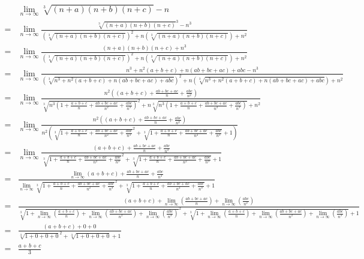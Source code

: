 \documentclass[a4paper,german,12pt,smallheadings]{scrartcl}
\begin{document}
\begin{landscape}
\begin{align*}
  &\lim_{n \to \infty} \sqrt[3]{(n+a)(n+b)(n+c)} - n \\
  = &\lim_{n \to \infty} \frac{\sqrt[3]{(n+a)(n+b)(n+c)}^3 - n^3}{\left(\sqrt[3]{(n+a)(n+b)(n+c)}\right)^2 + n\left(\sqrt[3]{(n+a)(n+b)(n+c)}\right) + n^2} \\
  = &\lim_{n \to \infty} \frac{(n+a)(n+b)(n+c) + n^3}{\left(\sqrt[3]{(n+a)(n+b)(n+c)}\right)^2 + n\left(\sqrt[3]{(n+a)(n+b)(n+c)}\right) + n^2} \\
  = &\lim_{n \to \infty} \frac{n^3 + n^2(a+b+c) + n(ab+bc+ac) + abc - n^3}{\left(\sqrt[3]{n^3 + n^2(a+b+c) + n(ab+bc+ac) + abc }\right)^2 + n\left(\sqrt[3]{n^3 + n^2(a+b+c) + n(ab+bc+ac) + abc }\right) + n^2} \\
  = &\lim_{n \to \infty} \frac{n^2\left((a+b+c) + \frac{ab+bc+ac}{n} + \frac{abc}{n^2}\right)}{\sqrt[3]{n^3 \left(1 + \frac{a+b+c}{n} + \frac{ab+bc+ac}{n^2} + \frac{abc}{n^3}\right)}^2 + n\sqrt[3]{n^3 \left(1 + \frac{a+b+c}{n} + \frac{ab+bc+ac}{n^2} + \frac{abc}{n^3}\right)} + n^2} \\
  = &\lim_{n \to \infty} \frac{n^2\left((a+b+c) + \frac{ab+bc+ac}{n} + \frac{abc}{n^2}\right)}{n^2\left(\sqrt[3]{1 + \frac{a+b+c}{n} + \frac{ab+bc+ac}{n^2} + \frac{abc}{n^3}}^2 + \sqrt[3]{1 + \frac{a+b+c}{n} + \frac{ab+bc+ac}{n^2} + \frac{abc}{n^3}} + 1\right)} \\
  = &\lim_{n \to \infty} \frac{(a+b+c) + \frac{ab+bc+ac}{n} + \frac{abc}{n^2}}{\sqrt[3]{1 + \frac{a+b+c}{n} + \frac{ab+bc+ac}{n^2} + \frac{abc}{n^3}}^2 + \sqrt[3]{1 + \frac{a+b+c}{n} + \frac{ab+bc+ac}{n^2} + \frac{abc}{n^3}} + 1} \\
  = &\frac{\lim_{n \to \infty} (a+b+c) + \frac{ab+bc+ac}{n} + \frac{abc}{n^2}}{\lim_{n \to \infty} \sqrt[3]{1 + \frac{a+b+c}{n} + \frac{ab+bc+ac}{n^2} + \frac{abc}{n^3}}^2 + \sqrt[3]{1 + \frac{a+b+c}{n} + \frac{ab+bc+ac}{n^2} + \frac{abc}{n^3}} + 1} \\
  = &\frac{(a+b+c) + \lim_{n \to \infty} \left(\frac{ab+bc+ac}{n}\right) + \lim_{n \to \infty}\left(\frac{abc}{n^2}\right)}{\sqrt[3]{1 + \lim_{n \to \infty} \left(\frac{a+b+c}{n}\right) + \lim_{n \to \infty} \left(\frac{ab+bc+ac}{n^2}\right) + \lim_{n \to \infty}\left(\frac{abc}{n^3}\right)}^2 + \sqrt[3]{1 + \lim_{n \to \infty} \left(\frac{a+b+c}{n}\right) + \lim_{n \to \infty} \left(\frac{ab+bc+ac}{n^2}\right) + \lim_{n \to \infty} \left(\frac{abc}{n^3}\right)} + 1} \\
  = &\frac{(a+b+c) + 0 + 0}{\sqrt[3]{1 + 0 + 0 + 0}^2 + \sqrt[3]{1 + 0 + 0 + 0} + 1} \\
  = &\frac{a+b+c}{3}
\end{align*}
\end{landscape}
\end{document}
